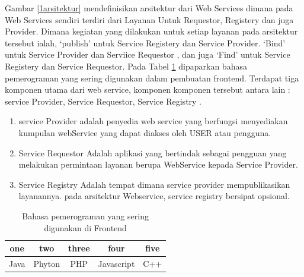 Gambar \ref{1arsitektur} mendefinisikan arsitektur dari Web Services dimana pada Web Services sendiri terdiri dari Layanan Untuk Requestor, Registery dan juga Provider. Dimana kegiatan yang dilakukan untuk setiap layanan pada arsitektur tersebut ialah, `publish' untuk Service Registery dan Service Provider. `Bind' untuk Service Provider dan Serviice Requestor , dan juga `Find' untuk Service Registery dan Service Requestor. Pada Tabel \ref{1table} dipaparkan bahasa pemerograman yang sering digunakan dalam pembuatan frontend. Terdapat tiga komponen utama dari web service, komponen komponen tersebut antara lain :
service Provider, Service Requestor, Service Registry .

\begin{enumerate}
\item service Provider adalah penyedia web service yang berfungsi menyediakan kumpulan webService yang dapat diakses oleh USER atau pengguna.
\item Service Requestor Adalah aplikasi yang bertindak sebagai pengguan yang melakukan permintaan layanan berupa WebService kepada Service Provider.
\item Service Registry Adalah tempat dimana service provider mempublikasikan layanannya. pada arsitektur Webservice, service registry bersipat opsional\cite{kurniawan2015implementasi}.
\end{enumerate}




\begin{table}[h]
\caption{Bahasa pemerograman yang sering digunakan di Frontend}
\centering
\begin{tabular}{ccccc}
\hline
one&two&three&four&five\\
\hline
Java&Phyton&PHP&Javascript&C++\\
\hline
\end{tabular}
\label{1table}
\end{table}




